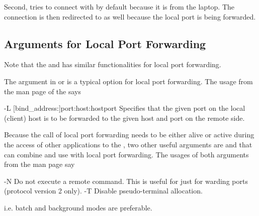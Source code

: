 Second,  tries to connect with 
by default because it is from the laptop. The connection is then
redirected to  as well because the local
port is being forwarded.


\subsection[Arguments for Local Port Forwarding]{Arguments for Local Port Forwarding}
\label{sec:arguments_local_port_forwarding}

Note that the  and  has similar functionalities
for local port forwarding.

The argument  in  or  is a typical option
for local port forwarding. The usage from the man page of the  says
\begin{Command}[title=From \code{ssh} man page]
-L [bind_address:]port:host:hostport
      Specifies that the given port on the local (client) host is
      to be forwarded to the given host and port on the remote side.
\end{Command}

Because the call of local port forwarding
needs to be either alive or active during the access
of other applications to the ,
two other useful arguments are  and  that can combine and
use with local port forwarding. The usages of both arguments
from the man page say
\begin{Command}[title=From \code{ssh} man page]
-N    Do not execute a remote command.  This is useful for just
      for warding ports (protocol version 2 only).
-T    Disable pseudo-terminal allocation.
\end{Command}
i.e. batch and background modes are preferable.

